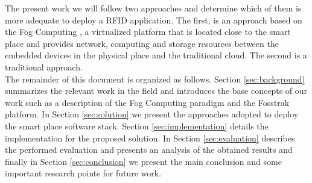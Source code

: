 The present work we will follow two approaches and determine which of them is more adequate to
deploy a \gls{RFID} application. The first, is an approach based on the Fog Computing \cite{bonomi2012fog},
a virtualized platform that is located close to the smart place and provides network, computing and storage
resources between the embedded devices in the physical place and the traditional cloud. The second is
a traditional approach.\\

The remainder of this document is organized as follows. Section \ref{sec:background} summarizes the
relevant work in the field and introduces the base concepts of our work such as a description of the
Fog Computing paradigm and the Fosstrak platform. In Section \ref{sec:solution} we present the approaches
adopted to deploy the smart place software stack. Section \ref{sec:implementation} details the
implementation for the proposed solution. In Section \ref{sec:evaluation} describes the performed
evaluation and presents an analysis of the obtained results and finally in Section \ref{sec:conclusion}
we present the main conclusion and some important research points for future work.
